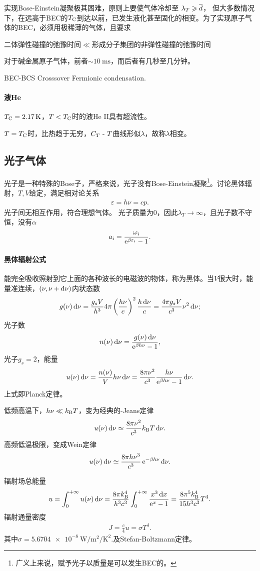 实现Bose-Einstein凝聚极其困难，原则上要使气体冷却至
$\lambda_T\geqslant\overline d$，
但大多数情况下，在远高于BEC的$T_\mathrm C$到达以前，已发生液化甚至固化的相变。为了实现原子气体的BEC，必须用极稀薄的气体，且要求
\begin{center}
	二体弹性碰撞的弛豫时间$\ll$形成分子集团的非弹性碰撞的弛豫时间
\end{center}
对于碱金属原子气体，前者$\sim\SI{10}\ms$，而后者有几秒至几分钟。%

BEC-BCS Crosssover Fermionic condensation.
\paragraph*{液He}$T_\crt=\SI{2.17}\K$，$T<T_\mathrm C$时的液He II具有超流性。

$T=T_\mathrm C$时，比热趋于无穷，$C_T~\text{-}~ T$曲线形似$\lambda$，故称$\lambda$相变。
\subsection{光子气体}
光子是一种特殊的Bose子，严格来说，光子没有Bose-Einstein凝聚\footnote{广义上来说，赋予光子以质量是可以发生BEC的。}。讨论黑体辐射，$T,V$给定，满足相对论关系
\begin{align}
	\varepsilon=h\nu=cp.
\end{align}
光子间无相互作用，符合理想气体。%
光子质量为0，因此$\lambda_T\to\infty$，且光子数不守恒，没有$\alpha$
\[
	a_i=\frac{\omega_i}{\mathop{}\!\mathrm{e}^{\beta\varepsilon_i}-1}.
\]
\paragraph*{黑体辐射公式}能完全吸收照射到它上面的各种波长的电磁波的物体，称为黑体。当$V$很大时，能量准连续，$(\nu,\nu+\mathop{}\!\mathrm{d}\nu)$内状态数
\[
	g(\nu)\mathop{}\!\mathrm{d}\nu=\frac{g_sV}{h^3}4\pi\left(\frac{h\nu}c\right)^2\frac{h\mathop{}\!\mathrm{d}\nu}{c}=\frac{4\pi g_sV}{c^3}\nu^2\mathop{}\!\mathrm{d}\nu;
\]
光子数 
\[
	n(\nu)\mathop{}\!\mathrm{d}\nu=\frac{g(\nu)\mathop{}\!\mathrm{d}\nu}{\mathop{}\!\mathrm{e}^{\beta h\nu}-1},
\]
光子$g_s=2$，能量 
\begin{align}
	u(\nu)\mathop{}\!\mathrm{d}\nu=\frac{n(\nu)}Vh\nu\mathop{}\!\mathrm{d}\nu=\frac{8\pi\nu^2}{c^3}\frac{h\nu}{\mathop{}\!\mathrm{e}^{\beta h\nu}-1}\mathop{}\!\mathrm{d}\nu.
\end{align}
上式即Planck定律。

低频高温下，$h\nu\ll k_{\mathrm B} T$，变为经典的\Rayl-Jeans定律
\[
	u(\nu)\mathop{}\!\mathrm{d}\nu\simeq\frac{8\pi\nu^2}{c^3}k_{\mathrm B} T\mathop{}\!\mathrm{d}\nu.
\]
高频低温极限，变成Wein定律
\[
	u(\nu)\mathop{}\!\mathrm{d}\nu\simeq\frac{8\pi h\nu^3}{c^3}\mathop{}\!\mathrm{e}^{-\beta h\nu}\mathop{}\!\mathrm{d}\nu.
\]

辐射场总能量
\[
	u=\int_0^{+\infty} u(\nu)\mathop{}\!\mathrm{d}\nu=\frac{8\pi k_{\mathrm B}^4}{h^3c^3}\int_0^{+\infty}\frac{x^3\mathop{}\!\mathrm{d} x}{\mathop{}\!\mathrm{e}^ x-1}=\frac{8\pi^5k_{\mathrm B}^4}{15h^3c^3}T^4.
\]
辐射通量密度
\begin{align}
	J=\frac c4u=\sigma T^4.
\end{align}
其中$\sigma=\SI{5.6704e-8}{\W\per\m\squared\per\K\squared}.$及Stefan-Boltzmann定律。

